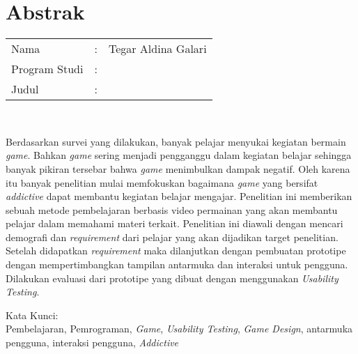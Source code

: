 %
%
%

\chapter*{Abstrak}

\vspace*{0.2cm}

\noindent \begin{tabular}{l l p{10cm}}
	Nama&: & Tegar Aldina Galari \\
	Program Studi&: & \program \\
	Judul&: & \judul \\
\end{tabular} \\ 

\vspace*{0.5cm}

\noindent 
Berdasarkan survei yang dilakukan, banyak pelajar menyukai kegiatan bermain \textit{game}. Bahkan \textit{game} sering menjadi pengganggu dalam kegiatan belajar sehingga banyak pikiran tersebar bahwa \textit{game} menimbulkan dampak negatif. Oleh karena itu banyak penelitian mulai memfokuskan bagaimana \textit{game} yang bersifat \textit{addictive} dapat membantu kegiatan belajar mengajar. Penelitian ini memberikan sebuah metode pembelajaran berbasis video permainan yang akan membantu pelajar dalam memahami materi terkait. Penelitian ini diawali dengan mencari demografi dan \textit{requirement} dari pelajar yang akan dijadikan target penelitian. Setelah didapatkan \textit{requirement} maka dilanjutkan dengan pembuatan prototipe dengan mempertimbangkan tampilan antarmuka dan interaksi untuk pengguna. Dilakukan evaluasi dari prototipe yang dibuat dengan menggunakan \textit{Usability Testing}.

\vspace*{0.2cm}

\noindent Kata Kunci: \\ 
\noindent Pembelajaran, Pemrograman, \textit{Game}, \textit{Usability Testing}, \textit{Game Design}, antarmuka pengguna, interaksi pengguna, \textit{Addictive}\\ 

\newpage